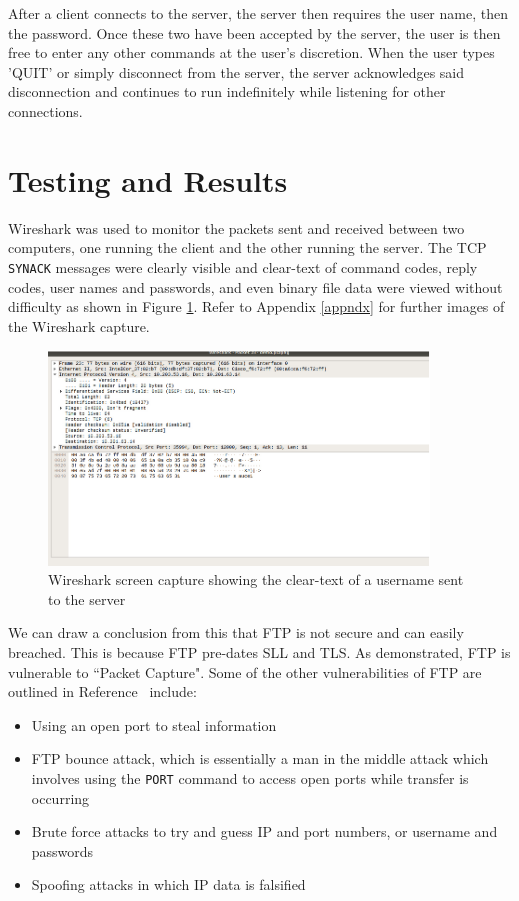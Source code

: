 \documentclass[journal, a4paper]{IEEEtran}
\begin{document}
After a client connects to the server, the server then requires the user name, then the password. Once these two have been accepted by the server, the user is then free to enter any other commands at the user's discretion. When the user types 'QUIT' or simply disconnect from the server, the server acknowledges said disconnection and continues to run indefinitely while listening for other connections.


\section{Testing and Results}
Wireshark was used to monitor the packets sent and received between two computers, one running the client and the other running the server. The TCP \texttt{SYNACK} messages were clearly visible and clear-text of command codes, reply codes, user names and passwords, and even binary file data were viewed without difficulty as shown in Figure \ref{Wirename}. Refer to Appendix \ref{appndx} for further images of the Wireshark capture.

\begin{figure}[hbtp!]
	\centering
	\includegraphics[width = 0.9\textwidth]{wireshark3}
	\caption{Wireshark screen capture showing the clear-text of a username sent to the server}
	\label{Wirename}
\end{figure}


We can draw a conclusion from this that FTP is not secure and can easily breached. This is because FTP pre-dates SLL and TLS. As demonstrated, FTP is vulnerable to ``Packet Capture". Some of the other vulnerabilities of FTP are outlined in Reference~\cite{rfc2557} include:
\begin{itemize}
	\item Using an open port to steal information
	\item FTP bounce attack, which is essentially a man in the middle attack which involves using the \texttt{PORT} command to access open ports while transfer is occurring
	\item Brute force attacks to try and guess IP and port numbers, or username and passwords
	\item Spoofing attacks in which IP data is falsified
\end{itemize}
\end{document}
